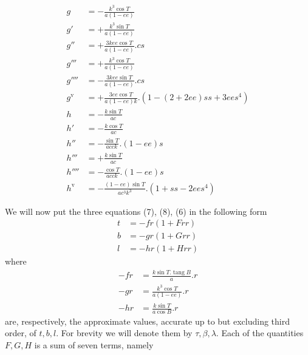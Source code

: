 %
\[
\begin{aligned}
g&=-\frac{k^3\cos T}{a(1-ee)}\\
g'&=+\frac{k^3\sin T}{a(1-ee)}\\
g''&=+\frac{3kee\cos T}{a(1-ee)}\mathord{.}cs\\
g'''&=+\frac{k^3\cos T}{a(1-ee)}\\
g''''&=-\frac{3kee\sin T}{a(1-ee)}\mathord{.}cs\\
g^{\mathrm{v}}&=+\frac{3ee\cos T}{a(1-ee)k}\mathord{.}(1-(2+2ee)ss+3ees^4)\\
h&=-\frac{k\sin T}{ac}\\
h'&=-\frac{k\cos T}{ac}\\
h''&=-\frac{\sin T}{acck}\mathord{.}(1-ee)s\\
h'''&=+\frac{k\sin T}{ac}\\
h''''&=-\frac{\cos T}{acck}\mathord{.}(1-ee)s\\
h^{\mathrm{v}}&=-\frac{(1-ee)\sin T}{ac^3k^3}\mathord{.}(1+ss-2ees^4)
\end{aligned}
\]

We will now put the three equations (7), (8), (6) in the following form
\[
\begin{aligned}
t&=-fr(1+Frr)\\
b&=-gr(1+Grr)\\
l&=-hr(1+Hrr)
\end{aligned}
\]
where
\[
\begin{aligned}
-fr&=\frac{k\sin T\mathord{.}\operatorname{tang}B}{a}\mathord{.}r\\
-gr&=\frac{k^3\cos T}{a(1-ee)}\mathord{.}r\\
-hr&=\frac{k\sin T}{a\cos B}\mathord{.}r
\end{aligned}
\]
are, respectively, the approximate values, accurate up to but excluding third order, of \(t,b,l\). For brevity we will denote them by \(\tau,\beta,\lambda\). Each of the quantities \(F,G,H\) is a sum of seven terms, namely
